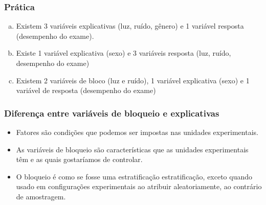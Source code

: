 \begin{frame}
\frametitle{Prática}
\justifying
{}
\small{
\begin{enumerate}[(a)]
\justifying
\item Existem 3 variáveis explicativas (luz, ruído, gênero) e 1 variável resposta (desempenho do exame).
\justifying
{}
\justifying
\item Existe 1 variável explicativa (sexo) e 3 variáveis resposta (luz, ruído, desempenho do exame)
\justifying
\item Existem 2 variáveis de bloco (luz e ruído), 1 variável explicativa (sexo) e 1 variável de resposta (desempenho do exame)
\end{enumerate}
}
\end{frame}


\begin{frame}
\frametitle{Diferença entre variáveis de bloqueio e explicativas}

\begin{itemize}
\justifying
\item Fatores são condições que podemos ser impostas nas unidades experimentais.
\justifying
\item As variáveis de bloqueio são características que as unidades experimentais têm e as quais gostaríamos de controlar.
\justifying
\item O bloqueio é como se fosse uma estratificação estratificação, exceto quando usado em configurações experimentais ao atribuir aleatoriamente, ao contrário de amostragem.

\end{itemize}

\end{frame}


